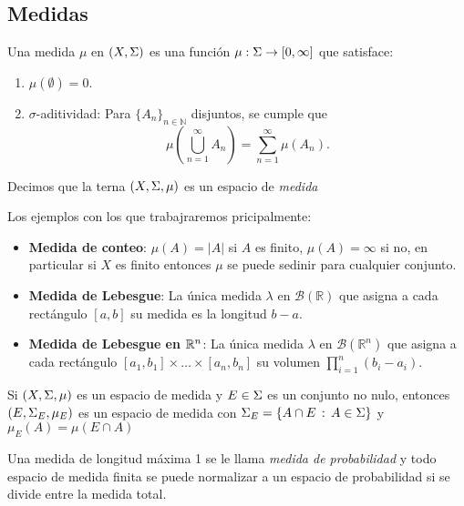 \documentclass[main.tex]{subfiles}
\begin{document}
\subsection{Medidas}
\begin{def.}
Una medida $\mu$ en $(X, \Sigma)$ es una función $\mu: \Sigma \to [0, \infty]$ que satisface:
\begin{enumerate}
    \item $\mu(\emptyset) = 0$.
    \item $\sigma$-aditividad: Para $\{A_n\}_{n \in \mathbb{N}}$ disjuntos, se cumple que
      \[
      \mu\left(\bigcup_{n=1}^\infty A_n\right) = \sum_{n=1}^\infty \mu(A_n).
      \]
\end{enumerate}
Decimos que la terna $(X,\Sigma,\mu)$ es un espacio de \emph{medida}
\end{def.}

\eje Los ejemplos con los que trabajraremos pricipalmente:
\begin{itemize}
    \item \textbf{Medida de conteo}: $\mu(A) = |A|$ si $A$ es finito, $\mu(A) = \infty$ si no, en particular si $X$ es finito entonces $\mu$ se puede sedinir para cualquier conjunto.
    \item \textbf{Medida de Lebesgue}: La única medida $\lambda$ en $\mathcal{B}(\mathbb{R})$ que asigna a cada rectángulo $[a,b]$ su medida es la longitud $b - a$.
    \item \textbf{Medida de Lebesgue en $\mathbb R ^n$}: La única medida $\lambda$ en $\mathcal{B}(\mathbb{R}^n)$ que asigna a cada rectángulo $[a_1, b_1] \times \dots \times [a_n, b_n]$ su volumen $\prod_{i=1}^n (b_i - a_i)$.
\end{itemize}

\exe Si $(X,\Sigma,\mu)$ es un espacio de medida y $E\in\Sigma$ es un conjunto no nulo, entonces $(E,\Sigma_E,\mu_E)$ es un espacio de medida con $\Sigma_E=\{A\cap E\,:\,A\in\Sigma\}$ y $\mu_E(A)=\mu(E\cap A)$

\obs Una medida de longitud máxima 1 se le llama \emph{medida de probabilidad} y todo espacio de medida finita se puede normalizar a un espacio de probabilidad si se divide entre la medida total.
\end{document}
